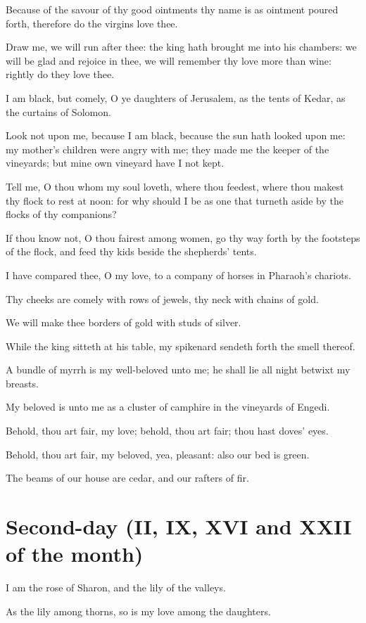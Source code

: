 \documentclass[0main.tex]{subfiles}
\begin{document}
Because of the savour of thy good ointments thy name is as ointment poured forth, therefore do the virgins love thee.

Draw me, we will run after thee: the king hath brought me into his chambers: we will be glad and rejoice in thee, we will remember thy love more than wine: rightly do they love thee.

I am black, but comely, O ye daughters of Jerusalem, as the tents of Kedar, as the curtains of Solomon.

Look not upon me, because I am black, because the sun hath looked upon me: my mother's children were angry with me; they made me the keeper of the vineyards; but mine own vineyard have I not kept.

Tell me, O thou whom my soul loveth, where thou feedest, where thou makest thy flock to rest at noon: for why should I be as one that turneth aside by the flocks of thy companions?

If thou know not, O thou fairest among women, go thy way forth by the footsteps of the flock, and feed thy kids beside the shepherds' tents.

I have compared thee, O my love, to a company of horses in Pharaoh's chariots.

Thy cheeks are comely with rows of jewels, thy neck with chains of gold.

We will make thee borders of gold with studs of silver.

While the king sitteth at his table, my spikenard sendeth forth the smell thereof.

A bundle of myrrh is my well-beloved unto me; he shall lie all night betwixt my breasts.

My beloved is unto me as a cluster of camphire in the vineyards of Engedi.

Behold, thou art fair, my love; behold, thou art fair; thou hast doves' eyes.

Behold, thou art fair, my beloved, yea, pleasant: also our bed is green.

The beams of our house are cedar, and our rafters of fir.

\section*{Second-day (II, IX, XVI and XXII of the month)}

I am the rose of Sharon, and the lily of the valleys.

As the lily among thorns, so is my love among the daughters.
\end{document}
